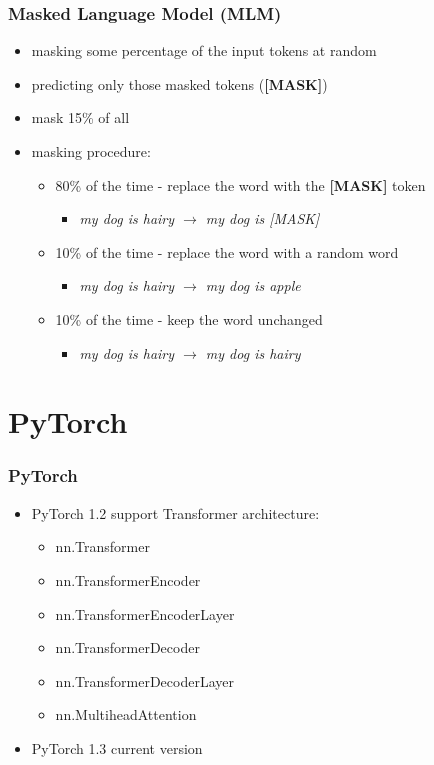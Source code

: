 \documentclass{beamer}
\begin{document}
\begin{frame}
    \frametitle{Masked Language Model (MLM)}
    \begin{itemize}
        \item masking some percentage of the input tokens at random
        \item predicting only those masked tokens (\textbf{[MASK]})
        \item mask 15\% of all
        \item masking procedure:
        \begin{itemize}
        	\item 80\% of the time - replace the word with the \textbf{[MASK]} token
        	\begin{itemize}
        		\item \textit{my dog is hairy $\rightarrow$ my dog is [MASK]}
        	\end{itemize}
        	\item 10\% of the time - replace the word with a random word
        	\begin{itemize}
        		\item \textit{my dog is hairy $\rightarrow$ my dog is apple}
        	\end{itemize}
        	\item 10\% of the time - keep the word  unchanged
        	\begin{itemize}
        		\item \textit{my dog is hairy $\rightarrow$ my dog is hairy}
        	\end{itemize}
        \end{itemize}
    \end{itemize}
\end{frame}



\section{PyTorch}
\begin{frame}
    \frametitle{PyTorch}
    \begin{itemize}
        \item PyTorch 1.2 support Transformer architecture:
        \begin{itemize}
            \item nn.Transformer
            \item nn.TransformerEncoder
            \item nn.TransformerEncoderLayer
            \item nn.TransformerDecoder
            \item nn.TransformerDecoderLayer
            \item nn.MultiheadAttention
        \end{itemize}
        \item PyTorch 1.3 current version
    \end{itemize}
\end{frame}
\end{document}
